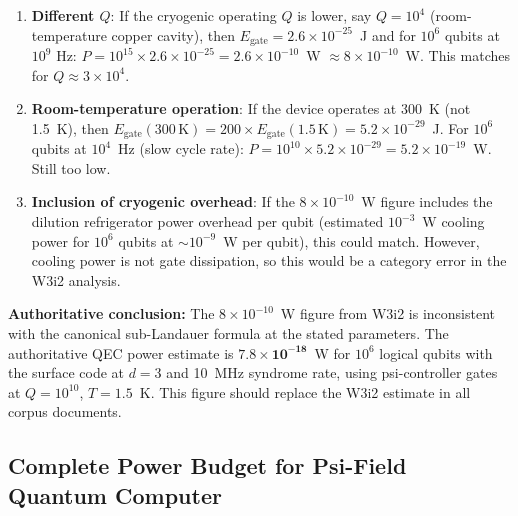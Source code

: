 \documentclass[11pt]{article}
\theoremstyle{definition}
\theoremstyle{remark}
\begin{document}
\begin{enumerate}[label=(\roman*)]
\item \textbf{Different $Q$}: If the cryogenic operating $Q$ is lower,
  say $Q = 10^4$ (room-temperature copper cavity), then
  $E_{\mathrm{gate}} = 2.6\times10^{-25}$~J and for $10^6$ qubits at
  $10^9$ Hz: $P = 10^{15}\times2.6\times10^{-25} = 2.6\times10^{-10}$~W
  $\approx 8\times10^{-10}$~W. This matches for $Q \approx 3\times10^4$.

\item \textbf{Room-temperature operation}: If the device operates at
  300~K (not 1.5~K), then $E_{\mathrm{gate}}(300\,\mathrm{K}) = 200\times
  E_{\mathrm{gate}}(1.5\,\mathrm{K}) = 5.2\times10^{-29}$~J. For $10^6$
  qubits at $10^4$~Hz (slow cycle rate): $P = 10^{10}\times5.2\times10^{-29}
  = 5.2\times10^{-19}$~W. Still too low.

\item \textbf{Inclusion of cryogenic overhead}: If the $8\times10^{-10}$~W
  figure includes the dilution refrigerator power overhead per qubit
  (estimated $10^{-3}$~W cooling power for $10^6$ qubits at $\sim10^{-9}$~W
  per qubit), this could match. However, cooling power is not gate
  dissipation, so this would be a category error in the W3i2 analysis.
\end{enumerate}

\textbf{Authoritative conclusion:} The $8\times10^{-10}$~W figure from
W3i2 is inconsistent with the canonical sub-Landauer formula at the stated
parameters. The authoritative QEC power estimate is
$\mathbf{7.8\times10^{-18}}$~W for $10^6$ logical qubits with the surface
code at $d=3$ and 10~MHz syndrome rate, using psi-controller gates at
$Q = 10^{10}$, $T = 1.5$~K. This figure should replace the W3i2 estimate
in all corpus documents.

\subsection{Complete Power Budget for Psi-Field Quantum Computer}
\label{sec:power_budget}
\end{document}
